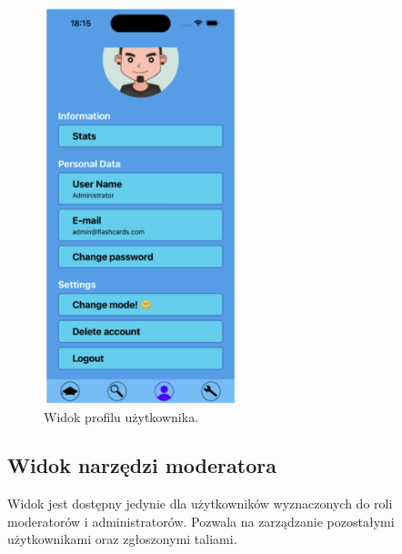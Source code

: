 \begin{figure}[H]
    \centering
    \includegraphics[width=0.5\textwidth]{chapters/chapter_10/images_mobile/mobile_profile}
    \caption{Widok profilu użytkownika.}
    \label{img:mobile_profile}
\end{figure}


\subsection{Widok narzędzi moderatora}
Widok jest dostępny jedynie dla użytkowników wyznaczonych do roli moderatorów i administratorów. Pozwala na zarządzanie pozostałymi użytkownikami oraz zgłoszonymi taliami.


